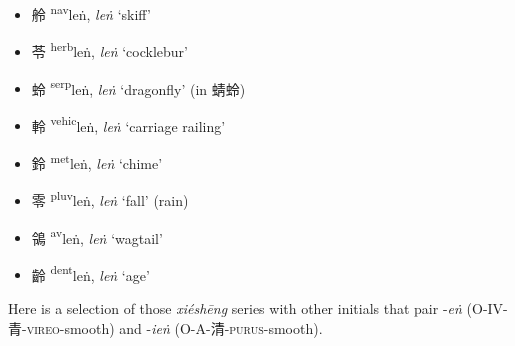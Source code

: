 \begin{itemize}
    \item {\Large{舲}} %
    {\large{{\textsuperscript{nav}}leṅ}},
    \textit{leṅ} `skiff' %

    \item {\Large{苓}} %
    {\large{{\textsuperscript{herb}}leṅ}},
    \textit{leṅ} `cocklebur' %

    \item {\Large{蛉}} %
    {\large{{\textsuperscript{serp}}leṅ}},
    \textit{leṅ} `dragonfly' (in 蜻蛉) %

    \item {\Large{軨}} %
    {\large{{\textsuperscript{vehic}}leṅ}},
    \textit{leṅ} `carriage railing' %

    \item {\Large{鈴}} %
    {\large{{\textsuperscript{met}}leṅ}},
    \textit{leṅ} `chime' %

    \item {\Large{零}} %
    {\large{{\textsuperscript{pluv}}leṅ}},
    \textit{leṅ} `fall' (rain) %

    \item {\Large{鴒}} %
    {\large{{\textsuperscript{av}}leṅ}},
    \textit{leṅ} `wagtail' %

    \item {\Large{齡}} %
    {\large{{\textsuperscript{dent}}leṅ}},
    \textit{leṅ} `age' %
\end{itemize}

Here is a selection of those \textit{xiéshēng} series with other initials that pair -\textit{eṅ} (O-IV-青-\textsc{vireo}-smooth) and  -\textit{ieṅ} (O-A-清-\textsc{purus}-smooth). 


